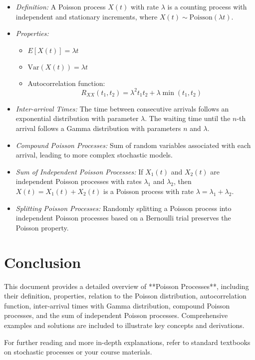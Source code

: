 \documentclass[12pt]{article}
\begin{document}
\begin{itemize}
    \item \textit{Definition:} A Poisson process \( X(t) \) with rate \( \lambda \) is a counting process with independent and stationary increments, where \( X(t) \sim \text{Poisson}(\lambda t) \).
    
    \item \textit{Properties:}
    \begin{itemize}
        \item \( E[X(t)] = \lambda t \)
        \item \( \text{Var}(X(t)) = \lambda t \)
        \item Autocorrelation function:
        \[
        R_{XX}(t_1, t_2) = \lambda^2 t_1 t_2 + \lambda \min(t_1, t_2)
        \]
    \end{itemize}
    
    \item \textit{Inter-arrival Times:} The time between consecutive arrivals follows an exponential distribution with parameter \( \lambda \). The waiting time until the \( n \)-th arrival follows a Gamma distribution with parameters \( n \) and \( \lambda \).
    
    \item \textit{Compound Poisson Processes:} Sum of random variables associated with each arrival, leading to more complex stochastic models.
    
    \item \textit{Sum of Independent Poisson Processes:} If \( X_1(t) \) and \( X_2(t) \) are independent Poisson processes with rates \( \lambda_1 \) and \( \lambda_2 \), then \( X(t) = X_1(t) + X_2(t) \) is a Poisson process with rate \( \lambda = \lambda_1 + \lambda_2 \).
    
    \item \textit{Splitting Poisson Processes:} Randomly splitting a Poisson process into independent Poisson processes based on a Bernoulli trial preserves the Poisson property.
\end{itemize}

\section{Conclusion}

This document provides a detailed overview of **Poisson Processes**, including their definition, properties, relation to the Poisson distribution, autocorrelation function, inter-arrival times with Gamma distribution, compound Poisson processes, and the sum of independent Poisson processes. Comprehensive examples and solutions are included to illustrate key concepts and derivations.

For further reading and more in-depth explanations, refer to standard textbooks on stochastic processes or your course materials.
\end{document}
